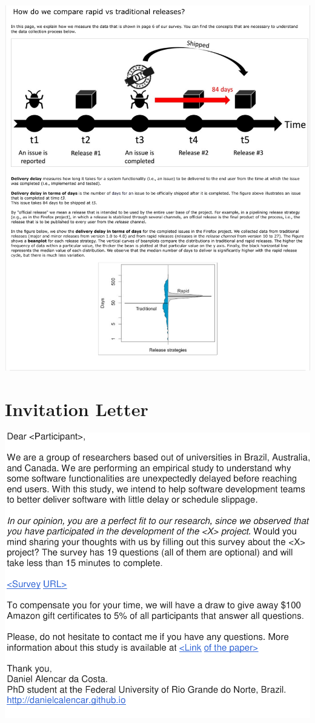 \documentclass[
	12pt,				%
	openright,			%
	oneside,			%
	a4paper,			%
	french,				%
	spanish,			%
	brazil,				%
	english
	]{abntex2}
\newcounter{pt}
\newcounter{th}
\begin{document}
\begin{apendicesenv}
\includegraphics[width=.9\textwidth,keepaspectratio]{chapters/chapter5/appendix/ShiftIntegrationDelay.pdf}

\chapter{Invitation Letter}\label{invitation_letter}

\includegraphics[width=.9\textwidth,keepaspectratio]{chapters/chapter5/appendix/invitation_letter.pdf}


\end{apendicesenv}
\end{document}
